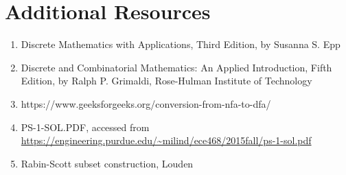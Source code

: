 \documentclass{article}
\begin{document}
\section*{Additional Resources}
\begin{enumerate}
\item Discrete Mathematics with Applications, Third Edition, by Susanna S. Epp
\item Discrete and Combinatorial Mathematics: An Applied Introduction, Fifth Edition, by Ralph P. Grimaldi, Rose-Hulman Institute of Technology

\item https://www.geeksforgeeks.org/conversion-from-nfa-to-dfa/ 
\item PS-1-SOL.PDF, accessed from \url{https://engineering.purdue.edu/~milind/ece468/2015fall/ps-1-sol.pdf}
\item Rabin-Scott subset construction, Louden
\end{enumerate}
\end{document}
